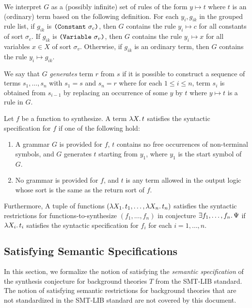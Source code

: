 \documentclass[english,a4paper,10pt]{article}
\begin{document}
We interpret $G$ as a (possibly infinite) set of rules 
of the form $y \mapsto t$ where $t$ is an (ordinary) term
based on the following definition.
For each $y_i, g_{ik}$ in the grouped rule list,
if $g_{ik}$ is $\texttt{(}\texttt{Constant}\mbox{ }\sigma_c\texttt{)}$,
then $G$ contains the rule $y_i \mapsto c$ for all constants of sort $\sigma_c$.
If $g_{ik}$ is $\texttt{(}\texttt{Variable}\mbox{ }\sigma_v\texttt{)}$,
then $G$ contains the rule $y_i \mapsto x$
for all variables $x \in X$ of sort $\sigma_v$.
Otherwise, if $g_{ik}$ is an ordinary term,
then $G$ contains the rule $y_i \mapsto g_{ik}$.

We say that $G$ \emph{generates} term $r$ from $s$
if it is possible to construct a sequence of terms
$s_1, \ldots, s_n$
with $s_1 = s$ and $s_n = r$
where for each $1 \leq i \leq n$, term $s_i$ is obtained from $s_{i-1}$ by
replacing an occurrence of some $y$ by $t$
where $y \mapsto t$ is a rule in $G$.

Let $f$ be a function to synthesize.
A term $\lambda X \ldotp t$
satisfies the syntactic specification for $f$
if one of the following hold:
\begin{enumerate}
\item 
A grammar $G$ is provided for $f$,
$t$ contains no free occurrences of non-terminal symbols,
and $G$ generates $t$ starting from $y_1$,
where $y_1$ is the start symbol of $G$.

\item
No grammar is provided for $f$, and $t$ is any
term allowed in the output logic whose sort
is the same as the return sort of $f$.
\end{enumerate}

Furthermore,
A tuple of functions 
$( \lambda X_1 \ldotp t_1, \ldots, \lambda X_n \ldotp t_n )$
satisfies the syntactic restrictions
for functions-to-synthesize $( f_1, \ldots, f_n )$
in conjecture $\exists f_1, \ldots, f_n \ldotp\Psi$
if $\lambda X_i \ldotp t_i$
satisfies the syntactic specification for $f_i$
for each $i=1,\ldots,n$.

\subsection{Satisfying Semantic Specifications}
\label{ssec:sat-semantic}

In this section,
we formalize the notion of satisfying the \emph{semantic specification}
of the synthesis conjecture
for background theories $T$ from the SMT-LIB standard.
The notion of satisfying semantic restrictions for background theories
that are not standardized in the SMT-LIB standard are not covered by this document.
\end{document}
